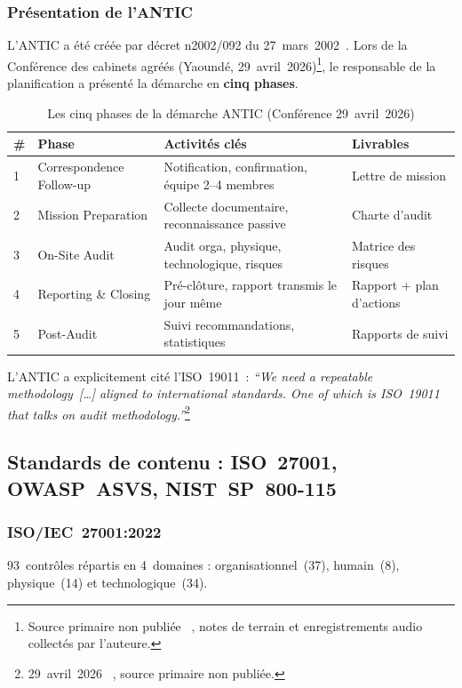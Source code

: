 \documentclass[12pt,a4paper,oneside]{report}
\begin{document}
\subsubsection{Pr\'esentation de l'ANTIC}

L'ANTIC a \'et\'e cr\'e\'ee par d\'ecret n\textdegree{}2002/092 du
27~mars~2002~\cite{decret2002}. Lors de la Conf\'erence des cabinets agr\'e\'es
(Yaound\'e, 29~avril~2026)\footnote{Source primaire non publi\'ee~ , notes de
terrain et enregistrements audio collect\'es par l'auteure.}, le responsable de
la planification a pr\'esent\'e la d\'emarche en \textbf{cinq phases}.

\begin{table}[H]
\centering\small
\caption{Les cinq phases de la d\'emarche ANTIC (Conf\'erence 29~avril~2026)}
\label{tab:antic5}
\begin{tabularx}{\textwidth}{p{0.5cm}p{3.5cm}p{5cm}X}
\toprule
\rowcolor{theadcolor}
\color{white}\textbf{\#} &
\color{white}\textbf{Phase} &
\color{white}\textbf{Activit\'es cl\'es} &
\color{white}\textbf{Livrables} \\
\midrule
1 & Correspondence Follow-up &
  Notification, confirmation, \'equipe 2--4 membres &
  Lettre de mission \\
2 & Mission Preparation &
  Collecte documentaire, reconnaissance passive &
  Charte d'audit \\
3 & On-Site Audit &
  Audit orga, physique, technologique, risques &
  Matrice des risques \\
4 & Reporting \& Closing &
  Pr\'e-cl\^oture, rapport transmis le jour m\^eme &
  Rapport + plan d'actions \\
5 & Post-Audit &
  Suivi recommandations, statistiques &
  Rapports de suivi \\
\bottomrule
\end{tabularx}
\end{table}

L'ANTIC a explicitement cit\'e l'ISO~19011~: \textit{``We need a repeatable
methodology~[\ldots] aligned to international standards. One of which is ISO~19011
that talks on audit methodology.''}\footnote{29~avril~2026~ , source primaire
non publi\'ee.}

\subsection{Standards de contenu : ISO~27001, OWASP~ASVS, NIST~SP~800-115}

\subsubsection{ISO/IEC~27001:2022}
93~contr\^oles r\'epartis en 4~domaines : organisationnel~(37), humain~(8),
physique~(14) et technologique~(34).
\end{document}
